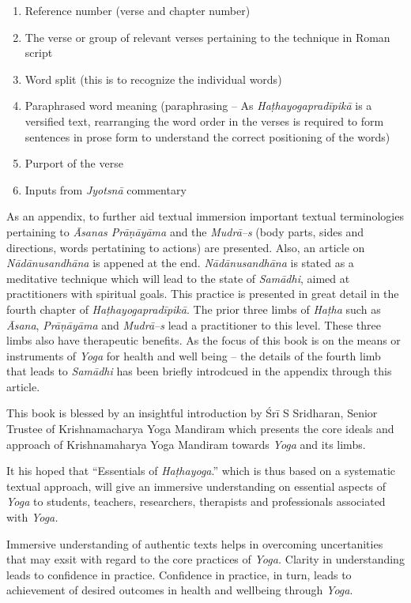 \begin{enumerate}
\item Reference number (verse and chapter number)
\item The verse or group of relevant verses pertaining to the technique in Roman script 
\item Word split (this is to recognize the individual words)
\item Paraphrased word meaning (paraphrasing – As \textit{Haṭhayogapradīpikā} is a versified text, rearranging the word order in the verses is required to form sentences in prose form to understand the correct positioning of the words)
\item Purport of the verse 
\item Inputs from \textit{Jyotsnā} commentary
\end{enumerate}

As an appendix, to further aid textual immersion important textual terminologies pertaining to \textit{Āsanas Prāṇāyāma} and the \textit{Mudrā–s} (body parts, sides and directions, words pertatining to actions) are presented. Also, an article on \textit{Nādānusandhāna} is appened at the end. \textit{Nādānusandhāna} is stated as a meditative technique which will lead to the state of \textit{Samādhi}, aimed at practitioners with spiritual goals. This practice is presented in great detail in the fourth chapter of \textit{Haṭhayogapradīpikā}. The prior three limbs of \textit{Haṭha} such as \textit{Āsana}, \textit{Prāṇāyāma} and \textit{Mudrā–s} lead a practitioner to this level. These three limbs also have therapeutic benefits. As the focus of this book is on the means or instruments of \textit{Yoga} for health and well being – the details of the fourth limb that leads to \textit{Samādhi} has been briefly introdcued in the appendix through this article.

This book is blessed by an insightful introduction by Śrī S Sridharan, Senior Trustee of Krishnamacharya Yoga Mandiram which presents the core ideals and approach of Krishnamaharya Yoga Mandiram towards \textit{Yoga} and its limbs.

It his hoped that “Essentials of \textit{Haṭhayoga}.” which is thus based on a systematic textual approach, will give an immersive understanding on essential aspects of \textit{Yoga} to students, teachers, researchers, therapists and professionals associated with \textit{Yoga.}

Immersive understanding of authentic texts helps in overcoming uncertanities that may exsit with regard to the core practices of \textit{Yoga.} Clarity in understanding leads to confidence in practice. Confidence in practice, in turn, leads to achievement of desired outcomes in health and wellbeing through \textit{Yoga}. 

